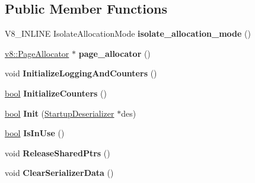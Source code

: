\subsection*{Public Member Functions}
\begin{DoxyCompactItemize}
\item 
\mbox{\label{classv8_1_1internal_1_1Isolate_a0eacca00e748b4fe0a537b933b91f825}} 
V8\+\_\+\+I\+N\+L\+I\+NE Isolate\+Allocation\+Mode {\bfseries isolate\+\_\+allocation\+\_\+mode} ()
\item 
\mbox{\label{classv8_1_1internal_1_1Isolate_a699900233b72446cb495c49ab6b035b7}} 
\mbox{\hyperlink{classv8_1_1PageAllocator}{v8\+::\+Page\+Allocator}} $\ast$ {\bfseries page\+\_\+allocator} ()
\item 
\mbox{\label{classv8_1_1internal_1_1Isolate_a85f6b664b0d7c6c8d93f8ded43cafb7f}} 
void {\bfseries Initialize\+Logging\+And\+Counters} ()
\item 
\mbox{\label{classv8_1_1internal_1_1Isolate_a1bde4b0f407820bb0619c6592a6b13bd}} 
\mbox{\hyperlink{classbool}{bool}} {\bfseries Initialize\+Counters} ()
\item 
\mbox{\label{classv8_1_1internal_1_1Isolate_af4077f2f945d4ea47ede3e5bbac2f0de}} 
\mbox{\hyperlink{classbool}{bool}} {\bfseries Init} (\mbox{\hyperlink{classv8_1_1internal_1_1StartupDeserializer}{Startup\+Deserializer}} $\ast$des)
\item 
\mbox{\label{classv8_1_1internal_1_1Isolate_a3bcf3323c5c0f0d0a2a94ff614db8be6}} 
\mbox{\hyperlink{classbool}{bool}} {\bfseries Is\+In\+Use} ()
\item 
\mbox{\label{classv8_1_1internal_1_1Isolate_a4b85af0ab78b92d72bde494b3e270a9f}} 
void {\bfseries Release\+Shared\+Ptrs} ()
\item 
\mbox{\label{classv8_1_1internal_1_1Isolate_ae33e1a45878190f15eece8c2281af1d3}} 
void {\bfseries Clear\+Serializer\+Data} ()
\item 
\mbox{\label{classv8_1_1internal_1_1Isolate_a589524fad102e8c01881e1e4b8e663ee}} 

\end{DoxyCompactItemize}
